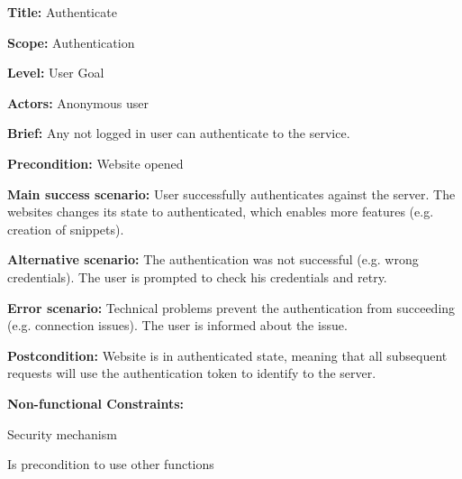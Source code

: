 
\begin{DoxyItemize}
\item {\bfseries{Title\+:}} Authenticate
\item {\bfseries{Scope\+:}} Authentication
\item {\bfseries{Level\+:}} User Goal
\item {\bfseries{Actors\+:}} Anonymous user
\item {\bfseries{Brief\+:}} Any not logged in user can authenticate to the service.
\end{DoxyItemize}


\begin{DoxyItemize}
\item {\bfseries{Precondition\+:}} Website opened
\item {\bfseries{Main success scenario\+:}} User successfully authenticates against the server. The websites changes its state to authenticated, which enables more features (e.\+g. creation of snippets).
\item {\bfseries{Alternative scenario\+:}} The authentication was not successful (e.\+g. wrong credentials). The user is prompted to check his credentials and retry.
\item {\bfseries{Error scenario\+:}} Technical problems prevent the authentication from succeeding (e.\+g. connection issues). The user is informed about the issue.
\item {\bfseries{Postcondition\+:}} Website is in authenticated state, meaning that all subsequent requests will use the authentication token to identify to the server.
\item {\bfseries{Non-\/functional Constraints\+:}}
\begin{DoxyItemize}
\item Security mechanism
\item Is precondition to use other functions 
\end{DoxyItemize}
\end{DoxyItemize}